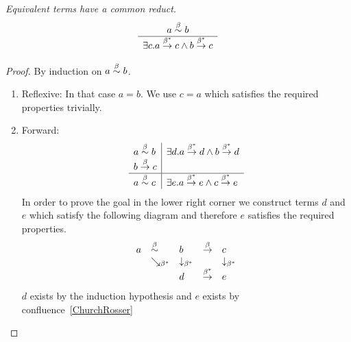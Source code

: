 \begin{theorem}
    \label{BetaEquivalentCommonReduct}
    \emph{Equivalent terms have a common reduct}.
    $$
    \begin{array}{c} 
        a \stackrel{\beta}{\sim} b
     \\ \hline 
        \exists c. a \stackrel{\beta^*}{\to} c \land b \stackrel{\beta^*}{\to} c
    \end{array}
    $$

    \begin{proof}
        By induction on $a \stackrel{\beta}{\sim} b$.
        \begin{enumerate}
            \item Reflexive: In that case $a = b$. We use $c = a$ which satisfies
            the required properties trivially.

            \item Forward:
            $$
            \begin{array}{l|l}
                a \stackrel{\beta}{\sim} b
                &
                \exists d. a \stackrel{\beta^*}{\to} d \land b \stackrel{\beta^*}{\to} d
                \\
                b \stackrel{\beta}{\to} c
                \\
                \hline
                a \stackrel{\beta}{\sim} c
                &
                \exists e. a \stackrel{\beta^*}{\to} e \land c \stackrel{\beta^*}{\to} e
            \end{array}
            $$
            In order to prove the goal in the lower right corner we construct
            terms $d$ and $e$ which satisfy the following diagram and therefore
            $e$ satisfies the required properties.
            $$
            \begin{array}{lllll}
                a
                &\stackrel{\beta}{\sim}
                &b
                &\stackrel{\beta}{\to}
                &c
                \\
                &\searrow_{\beta^*}
                &\downarrow_{\beta^*}
                &
                &\downarrow_{\beta^*}
                \\
                &
                &d
                &\stackrel{\beta^*}{\to}
                &e
            \end{array}
            $$
            $d$ exists by the induction hypothesis and $e$ exists by
            confluence~\ref{ChurchRosser}


\end{enumerate}
\end{proof}
\end{theorem}
